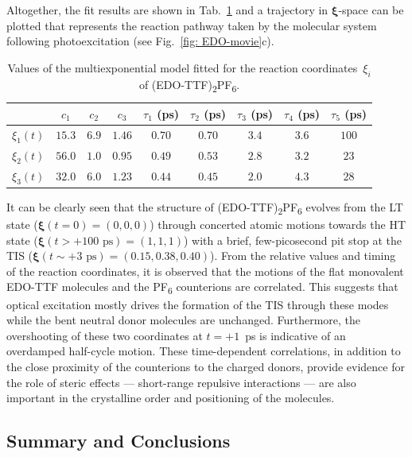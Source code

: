 Altogether, the fit results are shown in Tab.~\ref{tab: EDO-fit} and
a trajectory in $\boldsymbol{\xi}$-space can be plotted that represents the reaction pathway
taken by the molecular system following photoexcitation (see Fig.~\ref{fig: EDO-movie}c).
%
\begin{table}[ht!]
  \centering
  {\renewcommand{\arraystretch}{1.5}
  \begin{tabular}{ c c c c c c c c c }
    \toprule
      & $c_1$ & $c_2$ & $c_3$ & $\tau_{1}$ (ps) & $\tau_{2}$ (ps) & $\tau_{3}$ (ps) & $\tau_{4}$ (ps) & $\tau_{5}$ (ps) \\
    \midrule
    $\xi_1 (t)$ & $15.3$ & $6.9$ & $1.46$ & $0.70$ & $0.70$ & $3.4$ & $3.6$ & $100$\\
    $\xi_2 (t)$ & $56.0$ & $1.0$ & $0.95$ & $0.49$ & $0.53$ & $2.8$ & $3.2$ & $23$\\
    $\xi_3 (t)$ & $32.0$ & $6.0$ & $1.23$ & $0.44$ & $0.45$ & $2.0$ & $4.3$ & $28$\\
    \bottomrule
  \end{tabular}
  }
  \caption{Values of the multiexponential model fitted for
  the reaction coordinates~$\xi_i$ of (EDO-TTF)\textsubscript{2}PF\textsubscript{6}.}
  \label{tab: EDO-fit}
\end{table}
%
It can be clearly seen that
the structure of (EDO-TTF)\textsubscript{2}PF\textsubscript{6} evolves from the  LT state
($\boldsymbol{\xi}(t = 0) = (0, 0, 0)$) through concerted atomic motions
towards the HT state ($\boldsymbol{\xi}(t > +100 \text{ ps}) = (1, 1, 1)$)
with a brief, few-picosecond pit stop at the TIS
($\boldsymbol{\xi}(t \sim +3 \text{ ps}) = (0.15, 0.38, 0.40)$).
%
From the relative values and timing of the reaction coordinates,
it is observed that the motions of the flat monovalent EDO-TTF molecules and
the PF\textsubscript{6} counterions are correlated.
This suggests that optical excitation mostly drives the formation of the TIS through these modes
while the bent neutral donor molecules are unchanged.
%
Furthermore, the overshooting of these two coordinates at $t = +1$~ps is indicative
of an overdamped half-cycle motion.
%
These time-dependent correlations,
in addition to the close proximity of the counterions to the charged donors,
provide evidence for the role of steric effects --- short-range repulsive interactions ---
are also important in the crystalline order and positioning of the molecules.


\subsection{Summary and Conclusions}

